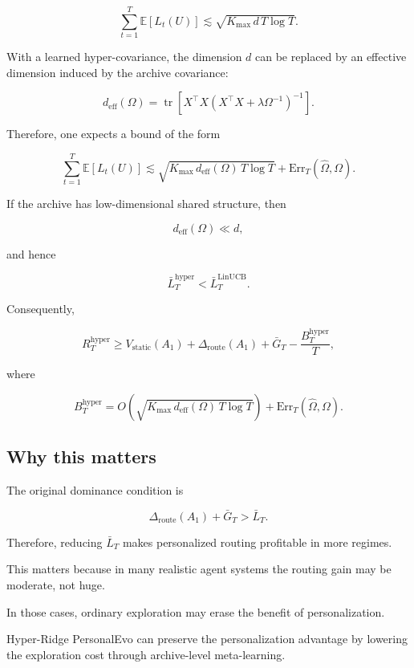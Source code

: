 \documentclass{article} %
\providecommand{\Rstatic}{V_{\mathrm{static}}}
\providecommand{\Droute}{\Delta_{\mathrm{route}}}
\providecommand{\deff}{d_{\mathrm{eff}}}
\providecommand{\Err}{\mathrm{Err}}
\providecommand{\Kmax}{K_{\max}}
\begin{document}
\[
\sum_{t=1}^{T} \mathbb{E}[L_t(U)] \lesssim \sqrt{ \Kmax\, d\, T \log T }.
\]

With a learned hyper-covariance, the dimension $d$ can be replaced by an
effective dimension induced by the archive covariance:

\[
\deff(\Omega)
= \operatorname{tr}\!\left[ X^\top X
  \left( X^\top X + \lambda \Omega^{-1} \right)^{-1} \right].
\]

Therefore, one expects a bound of the form

\[
\sum_{t=1}^{T} \mathbb{E}[L_t(U)]
\lesssim \sqrt{ \Kmax\, \deff(\Omega)\, T \log T }
+ \Err_T(\widehat{\Omega}, \Omega).
\]

If the archive has low-dimensional shared structure, then

\[
\deff(\Omega) \ll d,
\]

and hence

\[
\bar{L}_T^{\mathrm{hyper}} < \bar{L}_T^{\mathrm{LinUCB}}.
\]

Consequently,

\[
R_T^{\mathrm{hyper}}
\ge \Rstatic(A_1) + \Droute(A_1) + \bar{G}_T
- \frac{B_T^{\mathrm{hyper}}}{T},
\]

where

\[
B_T^{\mathrm{hyper}}
= O\!\left( \sqrt{ \Kmax\, \deff(\Omega)\, T \log T } \right)
+ \Err_T(\widehat{\Omega}, \Omega).
\]

\subsection{Why this matters}

The original dominance condition is

\[
\Droute(A_1) + \bar{G}_T > \bar{L}_T .
\]

Therefore, reducing $\bar{L}_T$ makes personalized routing profitable in more
regimes.

This matters because in many realistic agent systems the routing gain may be
moderate, not huge.

In those cases, ordinary exploration may erase the benefit
of personalization.

Hyper-Ridge PersonalEvo can preserve the personalization
advantage by lowering the exploration cost through archive-level
meta-learning.
\end{document}
